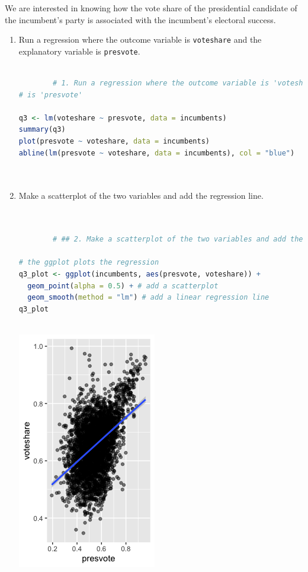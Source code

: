 \documentclass[12pt,letterpaper]{article}
\begin{document}
\noindent We are interested in knowing how the vote share of the presidential candidate of the incumbent's party is associated with the incumbent's electoral success.
	\vspace{.25cm}
	\begin{enumerate}
		\item Run a regression where the outcome variable is \texttt{voteshare} and the explanatory variable is \texttt{presvote}.
		
		
		\begin{lstlisting}[language=R]
		
		# 1. Run a regression where the outcome variable is 'voteshare' and the explanatory varaible'
# is 'presvote'

q3 <- lm(voteshare ~ presvote, data = incumbents)
summary(q3)
plot(presvote ~ voteshare, data = incumbents)
abline(lm(presvote ~ voteshare, data = incumbents), col = "blue")
		
		
		\end{lstlisting}
		
		
			\vspace{5cm}
		\item Make a scatterplot of the two variables and add the regression line. 
		
		
		\begin{lstlisting}[language=R]
		
		
		# ## 2. Make a scatterplot of the two variables and add the regression line

# the ggplot plots the regression
q3_plot <- ggplot(incumbents, aes(presvote, voteshare)) +
  geom_point(alpha = 0.5) + # add a scatterplot
  geom_smooth(method = "lm") # add a linear regression line
q3_plot
		
			\end{lstlisting}
			
			\includegraphics[scale=0.85]{plot_3.png}
		

\end{enumerate}
\end{document}
